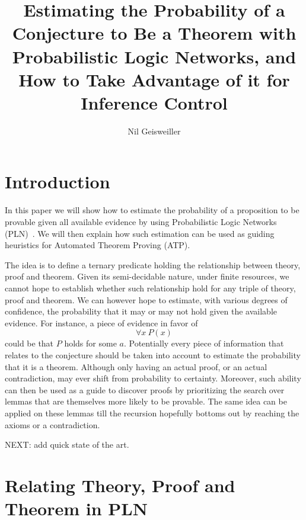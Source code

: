 \documentclass{easychair}
\title{Estimating the Probability of a Conjecture to Be a Theorem with
  Probabilistic Logic Networks, and How to Take Advantage of it for
  Inference Control}
\author{Nil Geisweiller}
\institute{
  SingularityNET Foundation,\\
  Zug, Switzerland\\
  \email{nil@singularitynet.io}
}
\begin{document}
\maketitle


\section{Introduction}

In this paper we will show how to estimate the probability of a
proposition to be provable given all available evidence by using
Probabilistic Logic Networks (PLN)~\cite{Goertzel09PLN}.  We will then
explain how such estimation can be used as guiding heuristics for
Automated Theorem Proving (ATP).

The idea is to define a ternary predicate holding the relationship
between theory, proof and theorem.  Given its semi-decidable nature,
under finite resources, we cannot hope to establish whether such
relationship hold for any triple of theory, proof and theorem.  We can
however hope to estimate, with various degrees of confidence, the
probability that it may or may not hold given the available evidence.
For instance, a piece of evidence in favor of
$$\forall x \ P(x)$$ could be that $P$ holds for some $a$.
Potentially every piece of information that relates to the conjecture
should be taken into account to estimate the probability that it is a
theorem.  Although only having an actual proof, or an actual
contradiction, may ever shift from probability to certainty.
Moreover, such ability can then be used as a guide to discover proofs
by prioritizing the search over lemmas that are themselves more likely
to be provable.  The same idea can be applied on these lemmas till the
recursion hopefully bottoms out by reaching the axioms or a
contradiction.

NEXT: add quick state of the art.

\section{Relating Theory, Proof and Theorem in PLN}
\end{document}
